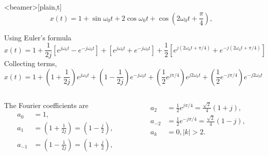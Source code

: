 \begin{frame}<beamer>[plain,t]
        \begin{equation*}
            x(t) = 1 + \sin \omega_0t + 2\cos\omega_0t+ \cos\left(2\omega_0t+ \frac{\pi}{4}\right),
        \end{equation*}

        Using Euler's formula
        \begin{equation*}
            x(t) = 1 + \frac{1}{2j}\left[e^{j\omega_0 t} - e^{-j\omega_0 t}\right] + \left[e^{j\omega_0 t} + e^{-j\omega_0 t}\right] + \frac{1}{2}\left[e^{j(2\omega_0 t + \pi/4)} + e^{-j(2\omega_0 t + \pi/4)}\right]
        \end{equation*}
        Collecting terms,
        \begin{equation*}
            x(t) = 1 + \left(1 + \frac{1}{2j}\right)e^{j\omega_0 t} +  \left(1 - \frac{1}{2j}\right)e^{-j\omega_0 t} + \left(\frac{1}{2} e^{j\pi/4}\right)e^{j2\omega_0 t} + \left(\frac{1}{2} e^{-j\pi/4}\right)e^{-j2\omega_0 t}
        \end{equation*}
        \begin{columns}
            \begin{column}{0.5\textwidth}
                The Fourier coefficients are
                \begin{equation*}
                    \begin{split}
                        a_0 &= 1,\\
                        a_1 &= \left(1 + \frac{1}{2j}\right) = \left(1 - \frac{j}{2}\right),\\
                        a_{-1} &= \left(1 - \frac{1}{2j}\right) = \left(1 + \frac{j}{2}\right),\\
                    \end{split}
                \end{equation*}
            \end{column}
            \begin{column}{0.5\textwidth}
                \begin{equation*}
                    \begin{split}
                        a_2 &= \frac{1}{2}e^{j\pi/4} = \frac{\sqrt{2}}{4}(1+j),\\
                        a_{-2} &= \frac{1}{2}e^{-j\pi/4} = \frac{\sqrt{2}}{4}(1-j),\\
                        a_k &= 0, |k|>2.
                    \end{split}
                \end{equation*}
            \end{column}
        \end{columns}

\end{frame}

